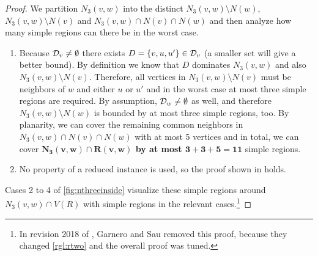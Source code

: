 \begin{proof}
        We partition $N_3(v,w)$ into the distinct $N_3(v,w) \setminus N(w)$, $N_3(v,w) \setminus N(v)$ and $N_3(v,w) \cap N(v) \cap N(w)$ and then analyze how many simple regions can there be in the worst case.

    \begin{enumerate}
        \item Because $\mathcal{D}_{v} \neq \emptyset$ there exists $D = \{v,u,u'\} \in \mathcal{D}_{v}$ (a smaller set will give a better bound). By definition we know that $D$ dominates $N_3(v,w)$ and also $N_3(v,w) \setminus N(v)$. Therefore, all vertices in $N_3(v,w) \setminus N(v)$ must be neighbors of $w$ and either $u$ or $u'$ and in the worst case at most three simple regions are required. By assumption, $\mathcal{D}_{w} \neq \emptyset$ as well, and therefore $N_3(v,w) \setminus N(w)$ is bounded by at most three simple regions, too.
        By planarity, we can cover the remaining common neighbors in $N_3(v,w) \cap N(v) \cap N(w)$ with at most 5 vertices and in total, we can cover \textbf{$\mathbf{N_3(v,w) \cap R(v,w)}$ by at most $\mathbf{3 + 3 +5 = 11}$} simple regions.

        \item No property of a reduced instance is used, so the proof shown in \cite[Revision 2018]{Garnero2018} holds. 

    
    \end{enumerate}

    Cases 2 to 4 of \cref{fig:nthreeinside} visualize these simple regions around $N_3(v,w) \cap V(R)$ with simple regions in the relevant cases.\footnote{In revision 2018 of \cite{Garnero2018}, Garnero and Sau removed this proof, because they changed \cref{rgl:rtwo} and the overall proof was tuned.}
    
\end{proof}


